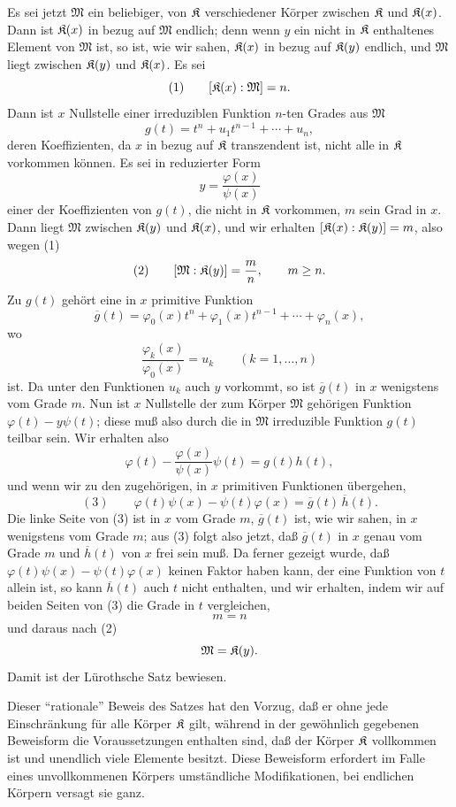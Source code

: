 Es sei jetzt \(\mathfrak M\) ein beliebiger, von \(\mathfrak K\) verschiedener Körper zwischen \(\mathfrak K\) und \(\mathfrak K(x)\). Dann ist \(\mathfrak K(x)\) in bezug auf \(\mathfrak M\) endlich; denn wenn \(y\) ein nicht in \(\mathfrak K\) enthaltenes Element von \(\mathfrak M\) ist, so ist, wie wir sahen, \(\mathfrak K(x)\) in bezug auf \(\mathfrak K(y)\) endlich, und \(\mathfrak M\) liegt zwischen \(\mathfrak K(y)\) und \(\mathfrak K(x)\). Es sei
\[
(1)\qquad [\mathfrak K(x):\mathfrak M]=n.
\]
Dann ist \(x\) Nullstelle einer irreduziblen Funktion \(n\)-ten Grades aus \(\mathfrak M\)
\[
g(t)=t^n+u_1t^{n-1}+\cdots+u_n,
\]
deren Koeffizienten, da \(x\) in bezug auf \(\mathfrak K\) transzendent ist, nicht alle in \(\mathfrak K\) vorkommen können. Es sei in reduzierter Form
\[
y=\frac{\varphi(x)}{\psi(x)}
\]
einer der Koeffizienten von \(g(t)\), die nicht in \(\mathfrak K\) vorkommen, \(m\) sein Grad in \(x\). Dann liegt \(\mathfrak M\) zwischen \(\mathfrak K(y)\) und \(\mathfrak K(x)\), und wir erhalten \([\mathfrak K(x):\mathfrak K(y)]=m\), also wegen (1)
\[
(2)\qquad [\mathfrak M:\mathfrak K(y)]=\frac{m}{n},\qquad m\geq n.
\]
Zu \(g(t)\) gehört eine in \(x\) primitive Funktion
\[
\overline g(t)=\varphi_0(x)t^n+\varphi_1(x)t^{n-1}+\cdots+\varphi_n(x),
\]
wo
\[
\frac{\varphi_k(x)}{\varphi_0(x)}=u_k\qquad(k=1,\ldots,n)
\]
ist. Da unter den Funktionen \(u_k\) auch \(y\) vorkommt, so ist \(\overline g(t)\) in \(x\) wenigstens vom Grade \(m\). Nun ist \(x\) Nullstelle der zum Körper \(\mathfrak M\) gehörigen Funktion \(\varphi(t)-y\psi(t)\); diese muß also durch die in \(\mathfrak M\) irreduzible Funktion \(g(t)\) teilbar sein. Wir erhalten also
\[
\varphi(t)-\frac{\varphi(x)}{\psi(x)}\psi(t)=g(t)h(t),
\]
und wenn wir zu den zugehörigen, in \(x\) primitiven Funktionen übergehen,
\[
(3)\qquad \varphi(t)\psi(x)-\psi(t)\varphi(x)=\overline g(t)\,\overline h(t).
\]
Die linke Seite von (3) ist in \(x\) vom Grade \(m\), \(\overline g(t)\) ist, wie wir sahen, in \(x\) wenigstens vom Grade \(m\); aus (3) folgt also jetzt, daß \(\overline g(t)\) in \(x\) genau vom Grade \(m\) und \(\overline h(t)\) von \(x\) frei sein muß. Da ferner gezeigt wurde, daß \(\varphi(t)\psi(x)-\psi(t)\varphi(x)\) keinen Faktor haben kann, der eine Funktion von \(t\) allein ist, so kann \(\overline h(t)\) auch \(t\) nicht enthalten, und wir erhalten, indem wir auf beiden Seiten von (3) die Grade in \(t\) vergleichen,
\[
m=n
\]
und daraus nach (2)
\[
\mathfrak M=\mathfrak K(y).
\]
Damit ist der Lürothsche Satz bewiesen.

Dieser ``rationale'' Beweis des Satzes hat den Vorzug, daß er ohne jede Einschränkung für alle Körper \(\mathfrak K\) gilt, während in der gewöhnlich gegebenen Beweisform die Voraussetzungen enthalten sind, daß der Körper \(\mathfrak K\) vollkommen ist und unendlich viele Elemente besitzt. Diese Beweisform erfordert im Falle eines unvollkommenen Körpers umständliche Modifikationen, bei endlichen Körpern versagt sie ganz.

